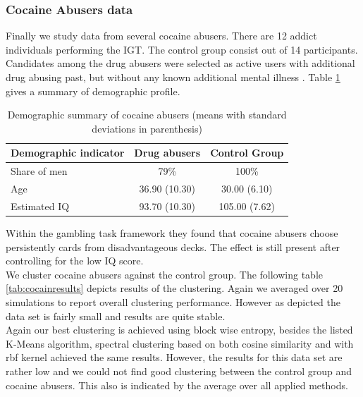\documentclass[12pt,a4paper,bibliography=totocnumbered,listof=totocnumbered]{scrartcl}
\begin{document}
{\subsubsection{Cocaine Abusers data}

Finally we study data from several cocaine abusers. There are 12 addict individuals performing the IGT. The control group consist out of 14 participants. Candidates among the drug abusers were selected as active users with additional drug abusing past, but without any known additional mental illness \cite{Stout2004}. Table \ref{tab:cocs} gives a summary of demographic profile.

\setlength{\tabcolsep}{12pt}
\renewcommand{\arraystretch}{1}
\begin{table}[H]
	\centering 
		\caption{Demographic summary of cocaine abusers (means with standard deviations in parenthesis)}
	\begin{tabular}{lcc}
		\toprule
		\textbf{Demographic indicator} & \textbf{Drug abusers} & \textbf{Control Group} \\
		\hline
		Share of men &  79\% & 100\%\\
		Age & 36.90 (10.30) & 30.00 (6.10) \\
		Estimated IQ &  93.70 (10.30) & 105.00 (7.62) \\
		\bottomrule
	\end{tabular}
	\label{tab:cocs}
\end{table}

Within the gambling task framework they found that cocaine abusers choose persistently cards from disadvantageous decks. The effect is still present after controlling for the low IQ score.\\
We cluster cocaine abusers against the control group. The following table \ref{tab:cocainresults} depicts results of the clustering. Again we averaged over 20 simulations to report overall clustering performance. However as depicted the data set is fairly small and results are quite stable.\\
Again our best clustering is achieved using block wise entropy, besides the listed K-Means algorithm, spectral clustering based on both cosine similarity and with rbf kernel achieved the same results. However, the results for this data set are rather low and we could not find  good clustering between the control group and cocaine abusers. This also is indicated by the average over all applied methods. 

}
\end{document}
